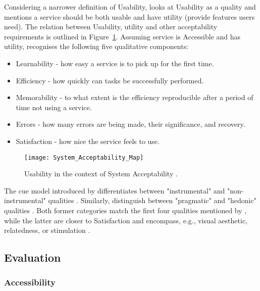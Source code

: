 Considering a narrower definition of Usability, \textcite{Nielsen_1993} looks at Usability as a quality and mentions a service should be both usable and have utility (provide features users need).
The relation between Usability, utility and other acceptability requirements is outlined in Figure~\ref{fig:system-acceptability}.
Assuming service is Accessible and has utility, \textcite{Nielsen_1993} recognises the following five qualitative components:

\begin{itemize}
    \item Learnability - how easy a service is to pick up for the first time.
    \item Efficiency - how quickly can tasks be successfully performed.
    \item Memorability - to what extent is the efficiency reproducible after a period of time not using a service.
    \item Errors - how many errors are being made, their significance, and recovery.
    \item Satisfaction - how nice the service feels to use.
\end{itemize}

\begin{figure}[ht]
    \centering
    \texttt{[image: System\_Acceptability\_Map]}
    \caption{Usability in the context of System Acceptability \parencite{Wilson_2009}.}
    \label{fig:system-acceptability}
\end{figure}

The \gls{cue} model introduced by \textcite{Thüring_Mahlke_2007} differentiates between "instrumental" and "non-instrumental" qualities \parencite[p. 1209]{Juergen_et_all_2020}.
Similarly, \textcite{Hassenzahl_2008} distinguish between "pragmatic" and "hedonic" qualities \parencite[p. 1209]{Juergen_et_all_2020}.
Both former categories match the first four qualities mentioned by \textcite{Nielsen_1993}, while the latter are closer to Satisfaction and encompass, e.g., visual aesthetic, relatedness, or stimulation \parencite{Thüring_Mahlke_2007, Hassenzahl_2008}.

\subsection{Evaluation}
\label{Literature-HSIE-Evaluation}

\subsubsection{Accessibility}

